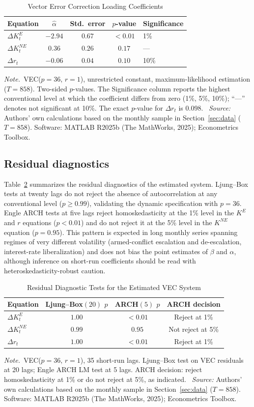 \documentclass[12pt]{article}
\numberwithin{equation}{section}
\numberwithin{table}{section}
\theoremstyle{definition}
\newcommand{\KE}{K^{E}}
\newcommand{\KNE}{K^{NE}}
\newcommand{\tabnote}{\par\addvspace{0.4em}\noindent\emph{Note.}}
\newcommand{\tabsource}{\ \textit{Source:} Authors' own calculations based on
the monthly sample in Section~\ref{sec:data} ($T=858$). Software: MATLAB
R2025b (The MathWorks, 2025); Econometrics Toolbox.}
\begin{document}
\begin{table}[t]
\centering
\caption{Vector Error Correction Loading Coefficients}
\label{tab:alpha}
\begin{tabular}{lcccl}
\toprule
Equation & $\hat\alpha$ & Std.\ error & $p$-value & Significance \\
\midrule
$\Delta \KE_t$  & $-2.94$ & $0.67$ & $<0.01$ & 1\% \\
$\Delta \KNE_t$ & $0.36$  & $0.26$ & $0.17$  & --- \\
$\Delta r_t$    & $-0.06$ & $0.04$ & $0.10$  & 10\% \\
\bottomrule
\end{tabular}
\tabnote\ VEC($p=36$, $r=1$), unrestricted constant, maximum-likelihood
estimation ($T=858$). Two-sided $p$-values. The Significance column reports
the highest conventional level at which the coefficient differs from zero
(1\%, 5\%, 10\%); ``---'' denotes not significant at 10\%. The exact
$p$-value for $\Delta r_t$ is $0.098$.
\tabsource
\end{table}

\subsection{Residual diagnostics}
\label{sec:diagnostics}

Table~\ref{tab:diagnostics} summarizes the residual diagnostics of the
estimated system. Ljung--Box tests at twenty lags do not reject the absence
of autocorrelation at any conventional level ($p\ge 0.99$), validating the
dynamic specification with $p=36$. Engle ARCH tests at five lags reject
homoskedasticity at the 1\% level in the $\KE$ and $r$ equations
($p<0.01$) and do not reject it at the 5\% level in the $\KNE$ equation
($p=0.95$). This pattern is expected in long monthly series spanning regimes
of very different volatility (armed-conflict escalation and de-escalation,
interest-rate liberalization) and does not bias the point estimates of
$\beta$ and $\alpha$, although inference on short-run coefficients should be
read with heteroskedasticity-robust caution.

\begin{table}[t]
\centering
\caption{Residual Diagnostic Tests for the Estimated VEC System}
\label{tab:diagnostics}
\begin{tabular}{lccc}
\toprule
Equation & Ljung--Box$(20)$ $p$ & ARCH$(5)$ $p$ & ARCH decision \\
\midrule
$\Delta \KE_t$  & $1.00$ & $<0.01$ & Reject at 1\% \\
$\Delta \KNE_t$ & $0.99$ & $0.95$  & Not reject at 5\% \\
$\Delta r_t$    & $1.00$ & $<0.01$ & Reject at 1\% \\
\bottomrule
\end{tabular}
\tabnote\ VEC($p=36$, $r=1$), 35 short-run lags. Ljung--Box test on VEC
residuals at 20 lags; Engle ARCH LM test at 5 lags. ARCH decision: reject
homoskedasticity at 1\% or do not reject at 5\%, as indicated.
\tabsource
\end{table}
\end{document}
